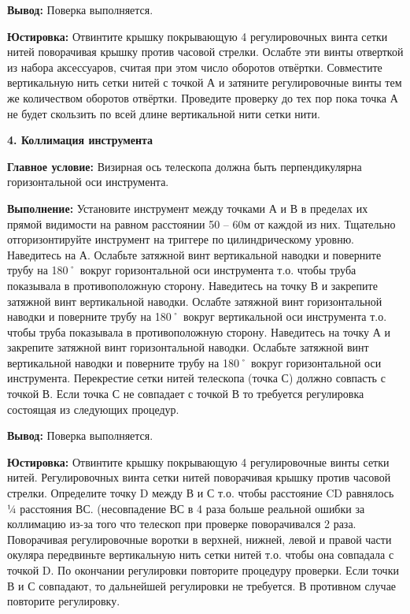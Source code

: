 \documentclass[a4paper]{article}
\begin{document}
\begin{newpage}
{    \par\textbf{Вывод:} Поверка выполняется.
    \par\textbf{Юстировка:} Отвинтите крышку покрывающую 4 регулировочных винта сетки нитей поворачивая крышку против часовой стрелки. Ослабте эти винты отверткой из набора аксессуаров, считая при этом число оборотов отвёртки. Совместите вертикальную нить сетки нитей с точкой А и затяните регулировочные винты тем же количеством оборотов отвёртки. Проведите проверку до тех пор пока точка А не будет скользить по всей длине вертикальной нити сетки нити.
}
\large{
    \par\textbf{4. Коллимация инструмента}
    \par\textbf{Главное условие:} Визирная ось телескопа должна быть перпендикулярна горизонтальной оси инструмента.
    \par\textbf{Выполнение:} Установите инструмент между точками А и В в пределах их прямой видимости на равном расстоянии 50 – 60м от каждой из них. Тщательно отгоризонтируйте инструмент на триггере по цилиндрическому уровню. Наведитесь на А. Ослабьте затяжной винт вертикальной наводки и поверните трубу на 180˚ вокруг горизонтальной оси инструмента т.о. чтобы труба показывала в противоположную сторону. Наведитесь на точку В и закрепите затяжной винт вертикальной наводки. Ослабте затяжной винт горизонтальной наводки и поверните трубу на 180˚ вокруг вертикальной оси инструмента т.о. чтобы труба показывала в противоположную сторону. Наведитесь на точку А и закрепите затяжной винт горизонтальной наводки. Ослабьте затяжной винт вертикальной наводки и поверните трубу на 180˚ вокруг горизонтальной оси инструмента. Перекрестие сетки нитей телескопа (точка С) должно совпасть с точкой В. Если точка С не совпадает с точкой В то требуется регулировка состоящая из следующих процедур.
    \par\textbf{Вывод:} Поверка выполняется.
    \par\textbf{Юстировка:} Отвинтите крышку покрывающую 4 регулировочные винты сетки нитей. Регулировочных винта сетки нитей поворачивая крышку против часовой стрелки. Определите точку D между В и С т.о. чтобы расстояние CD равнялось ¼ расстояния ВС. (несовпадение ВС в 4 раза больше реальной ошибки за коллимацию из-за того что телескоп при проверке поворачивался 2 раза. Поворачивая регулировочные воротки в верхней, нижней, левой и правой части окуляра передвиньте вертикальную нить сетки нитей т.о. чтобы она совпадала с точкой D. По окончании регулировки повторите процедуру проверки. Если точки В и С совпадают, то дальнейшей регулировки не требуется. В противном случае повторите регулировку.
}
\end{newpage}
\end{document}

